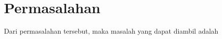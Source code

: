 \section{Permasalahan}
\label{sec:permasalahan}

Dari permasalahan tersebut, maka masalah yang dapat diambil adalah \textcolor{red}{\lipsum[1][1-4]}
